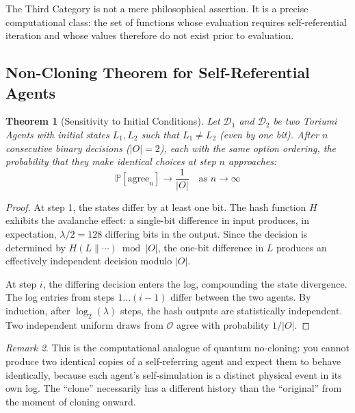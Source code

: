 \documentclass[12pt,a4paper]{article}
\newtheorem{theorem}{Theorem}[section]
\theoremstyle{definition}
\theoremstyle{remark}
\newtheorem{remark}[theorem]{Remark}
\newcommand{\cO}{\mathcal{O}}
\newcommand{\cD}{\mathcal{D}}
\newcommand{\Pp}{\mathbb{P}}
\begin{document}
The Third Category is not a mere philosophical assertion. It is a precise
computational class: the set of functions whose evaluation requires
self-referential iteration and whose values therefore do not exist prior
to evaluation.

\subsection{Non-Cloning Theorem for Self-Referential Agents}

\begin{theorem}[Sensitivity to Initial Conditions]\label{thm:clone}
Let $\cD_1$ and $\cD_2$ be two Toriumi Agents with initial states $L_1, L_2$
such that $L_1 \neq L_2$ (even by one bit). After $n$ consecutive binary
decisions ($|O| = 2$), each with the same option ordering, the probability
that they make identical choices at step $n$ approaches:
\begin{equation}
\Pp[\text{agree}_n] \to \frac{1}{|O|} \quad \text{as } n \to \infty
\end{equation}
\end{theorem}

\begin{proof}
At step 1, the states differ by at least one bit. The hash function $H$ exhibits
the avalanche effect: a single-bit difference in input produces, in expectation,
$\lambda/2 = 128$ differing bits in the output. Since the decision is determined
by $H(L \parallel \cdots) \bmod |O|$, the one-bit difference in $L$ produces an
effectively independent decision modulo $|O|$.

At step $i$, the differing decision enters the log, compounding the state
divergence. The log entries from steps $1 \ldots (i-1)$ differ between the
two agents. By induction, after $\log_2(\lambda)$ steps, the hash outputs are
statistically independent. Two independent uniform draws from $\cO$ agree with
probability $1/|O|$.
\end{proof}

\begin{remark}
This is the computational analogue of quantum no-cloning: you cannot produce
two identical copies of a self-referring agent and expect them to behave
identically, because each agent's self-simulation is a distinct physical event
in its own log. The ``clone'' necessarily has a different history than the
``original'' from the moment of cloning onward.
\end{remark}
\end{document}
